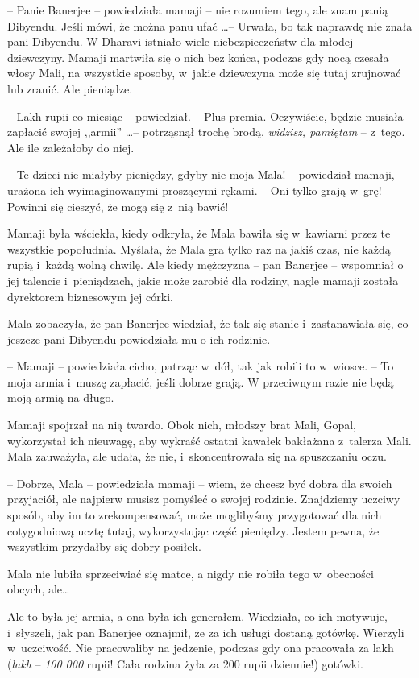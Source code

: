 \documentclass[oneside,polish,11pt,rmheadings]{mwbk}
\begin{document}
-- Panie Banerjee -- powiedziała mamaji -- nie rozumiem tego, ale znam panią Dibyendu. Jeśli mówi, że można panu ufać \ldots  -- Urwała, bo tak naprawdę nie znała pani Dibyendu. W Dharavi istniało wiele niebezpieczeństw dla młodej dziewczyny. Mamaji martwiła się o nich bez końca, podczas gdy nocą czesała włosy Mali, na wszystkie sposoby, w~jakie dziewczyna może się tutaj zrujnować lub zranić. Ale pieniądze. 


-- Lakh rupii co miesiąc -- powiedział. -- Plus premia. Oczywiście, będzie musiała zapłacić swojej ,,armii''  \ldots  -- potrząsnął trochę brodą, \textit{widzisz, pamiętam }-- z~tego. Ale ile zależałoby do niej.  


-- Te dzieci nie miałyby pieniędzy, gdyby nie moja Mala! -- powiedział mamaji, urażona ich wyimaginowanymi proszącymi rękami. -- Oni tylko grają w~grę! Powinni się cieszyć, że mogą się z~nią bawić! 

Mamaji była wściekła, kiedy odkryła, że Mala bawiła się w~kawiarni przez te wszystkie popołudnia. Myślała, że Mala gra tylko raz na jakiś czas, nie każdą rupią i~każdą wolną chwilę. Ale kiedy mężczyzna -- pan Banerjee -- wspomniał o jej talencie i~pieniądzach, jakie może zarobić dla rodziny, nagle mamaji została dyrektorem biznesowym jej córki. 


Mala zobaczyła, że pan Banerjee wiedział, że tak się stanie i~zastanawiała się, co jeszcze pani Dibyendu powiedziała mu o ich rodzinie. 


-- Mamaji -- powiedziała cicho, patrząc w~dół, tak jak robili to w~wiosce. -- To moja armia i~muszę zapłacić, jeśli dobrze grają. W przeciwnym razie nie będą moją armią na długo. 


Mamaji spojrzał na nią twardo. Obok nich, młodszy brat Mali, Gopal, wykorzystał ich nieuwagę, aby wykraść ostatni kawałek bakłażana z~talerza Mali. Mala zauważyła, ale udała, że nie, i~skoncentrowała się na spuszczaniu oczu. 


-- Dobrze, Mala -- powiedziała  mamaji -- wiem, że chcesz być dobra dla swoich przyjaciół, ale najpierw musisz pomyśleć o swojej rodzinie. Znajdziemy uczciwy sposób, aby im to zrekompensować, może moglibyśmy przygotować dla nich cotygodniową ucztę tutaj, wykorzystując część pieniędzy. Jestem pewna, że wszystkim przydałby się dobry posiłek. 


Mala nie lubiła sprzeciwiać się matce, a nigdy nie robiła tego w~obecności obcych, ale\ldots  


Ale to była jej armia, a ona była ich generałem. Wiedziała, co ich motywuje, i~słyszeli, jak pan Banerjee oznajmił, że za ich usługi dostaną gotówkę. Wierzyli w~uczciwość. Nie pracowaliby na jedzenie, podczas gdy ona pracowała za lakh (\textit{lakh }-- \textit{100 000 }rupii! Cała rodzina żyła za 200 rupii dziennie!) gotówki. 
\end{document}
